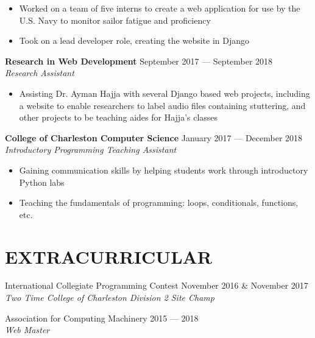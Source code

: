 \documentclass[letterpaper,14pt]{extarticle}
\begin{document}
  \begin{itemize}[itemsep=0pt, topsep=2pt]
    \item{Worked on a team of five interns to create a web application for use by the U.S. Navy to monitor sailor fatigue and proficiency}
    \item{Took on a lead developer role, creating the website in Django} \end{itemize}

  \textbf{Research in Web Development}
  \hspace*{\fill}
  \textcolor{color2}{September 2017 --- September 2018}
  \\ 
  \textcolor{color2}{
    \textit{
      \qquad{} Research Assistant
    }
  }

  \begin{itemize}[itemsep=0pt, topsep=2pt]
    \item{Assisting Dr. Ayman Hajja with several Django based web projects, including a website to enable researchers to label audio files containing stuttering, and other projects to be teaching aides for Hajja’s classes}
  \end{itemize}


  \textbf{College of Charleston Computer Science}
  \hspace*{\fill}
  \textcolor{color2}{January 2017 --- December 2018}
  \\ 
  \textcolor{color2}{
    \textit{
      \qquad{} Introductory Programming Teaching Assistant
    }
  }

  \begin{itemize}[itemsep=0pt, topsep=2pt]
    \item{Gaining communication skills by helping students work through introductory Python labs}
    \item{Teaching the fundamentals of programming: loops, conditionals, functions, etc.}
  \end{itemize}


\section*{EXTRACURRICULAR}
  {International Collegiate Programming Contest}
  \hspace*{\fill}
  \textcolor{color2}{November 2016 \& November 2017}
  \\ 
  \textcolor{color2}{
    \textit{
      \qquad{} Two Time College of Charleston Division 2 Site Champ
    }
  }

  \vspace*{4pt}

  {Association for Computing Machinery}
  \hspace*{\fill}
  \textcolor{color2}{2015 --- 2018}
  \\ 
  \textcolor{color2}{
    \textit{
      \qquad{} Web Master
    }
  }
\end{document}
